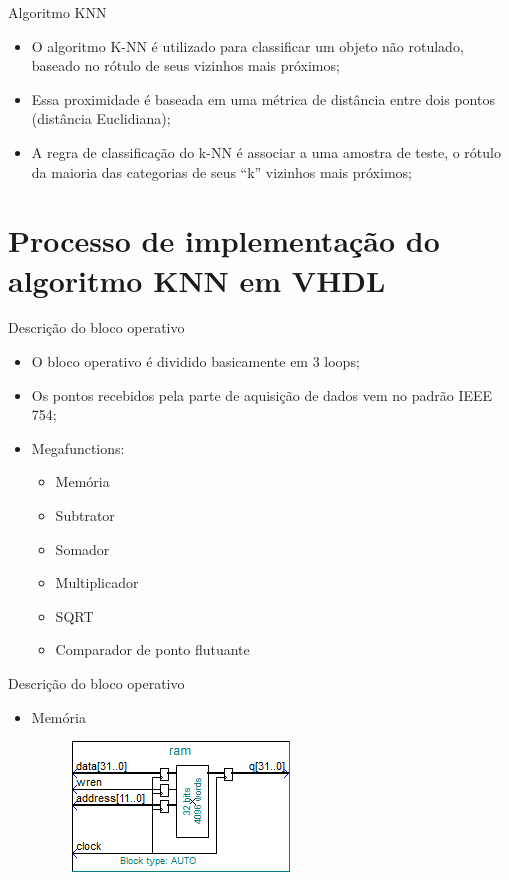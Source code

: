 \documentclass[11pt]{beamer}
\begin{document}
\begin{frame}{Algoritmo KNN}

\begin{itemize}
	\item O algoritmo K-NN é utilizado para classificar um objeto não rotulado,
	baseado no rótulo de seus vizinhos mais próximos;
	\item Essa proximidade é baseada em uma métrica de distância entre dois
	pontos (distância Euclidiana);
	\item A regra de classificação do k-NN é associar a uma amostra de teste, o
	rótulo da maioria das categorias de seus “k” vizinhos mais próximos;
\end{itemize}

\end{frame}


\section{Processo de implementação do algoritmo KNN em VHDL}
\begin{frame}{Descrição do bloco operativo}
	\begin{itemize}
	\item O bloco operativo é dividido basicamente em 3 loops;
	\item Os pontos recebidos pela parte de aquisição de dados vem no padrão
	IEEE 754;
	\item Megafunctions:
		\begin{itemize}
		\item Memória
		\item Subtrator
		\item Somador
		\item Multiplicador
		\item SQRT
		\item Comparador de ponto flutuante
		\end{itemize}
	\end{itemize}
\end{frame}

\begin{frame}{Descrição do bloco operativo}
	\begin{itemize}
	\item Memória
	\begin{figure}[ht]
	\centering
	\includegraphics[width=.5\textwidth]{ram}
	\label{fig:ram}
	\end{figure}
	\end{itemize}
\end{frame}
\end{document}
